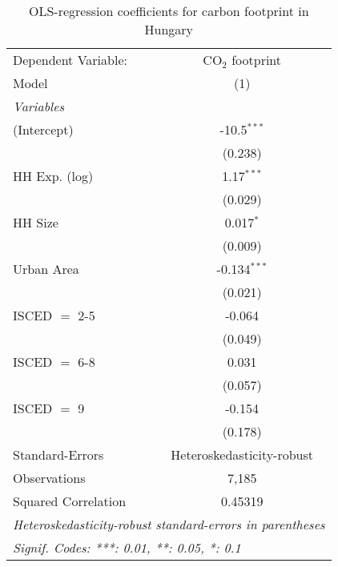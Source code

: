 
\begin{table}[htbp!]
   \centering
   \small
   \begin{adjustbox}{width = 1\textwidth, max height = 0.95\textheight, center}
      \begin{threeparttable}[b]
         \caption{\label{tab:OLS_2_HUN} OLS-regression coefficients for carbon footprint in Hungary}
         \begin{tabular}{lc}
            \tabularnewline \midrule \midrule
            Dependent Variable: & CO$_{2}$ footprint\\  
            Model               & (1)\\  
            \midrule
            \emph{Variables}\\
            (Intercept)         & -10.5$^{***}$\\   
                                & (0.238)\\   
            HH Exp. (log)       & 1.17$^{***}$\\   
                                & (0.029)\\   
            HH Size             & 0.017$^{*}$\\   
                                & (0.009)\\   
            Urban Area          & -0.134$^{***}$\\   
                                & (0.021)\\   
            ISCED $=$ 2-5       & -0.064\\   
                                & (0.049)\\   
            ISCED $=$ 6-8       & 0.031\\   
                                & (0.057)\\   
            ISCED $=$ 9         & -0.154\\   
                                & (0.178)\\   
            \midrule 
            Standard-Errors     & Heteroskedasticity-robust \\   
            Observations        & 7,185\\  
            Squared Correlation & 0.45319\\  
            \midrule \midrule
            \multicolumn{2}{l}{\emph{Heteroskedasticity-robust standard-errors in parentheses}}\\
            \multicolumn{2}{l}{\emph{Signif. Codes: ***: 0.01, **: 0.05, *: 0.1}}\\
         \end{tabular}
         

\end{threeparttable}
\end{adjustbox}
\end{table}
